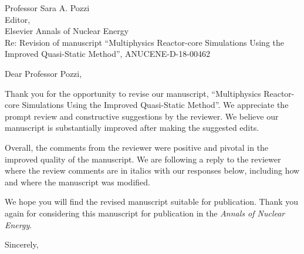 \documentclass[11pt]{letter}
\begin{document}

\begin{letter}{Professor Sara A. Pozzi\\
    Editor,\\
    Elsevier Annals of Nuclear Energy\\
    \bigskip
    Re: Revision of manuscript ``Multiphysics Reactor-core Simulations Using the Improved Quasi-Static Method'', ANUCENE-D-18-00462}
\date{\today}

\opening{Dear Professor Pozzi,}
         \vspace{0.25cm}

Thank you for the opportunity to revise our manuscript, ``Multiphysics Reactor-core Simulations Using the Improved Quasi-Static Method''. We appreciate the prompt review and constructive suggestions by the reviewer. We believe our manuscript is substantially improved after making the suggested edits.

Overall, the comments from the reviewer were positive and pivotal in the improved quality of the manuscript. We are following a reply to the reviewer where the review comments are in italics with our responses below, including how and where the manuscript was modified.

We hope you will find the revised manuscript suitable for publication. Thank you again for considering this manuscript for publication in the {\it Annals of Nuclear Energy}.

\vspace{0.25cm}



\closing{Sincerely, }

\end{letter}
\end{document}
